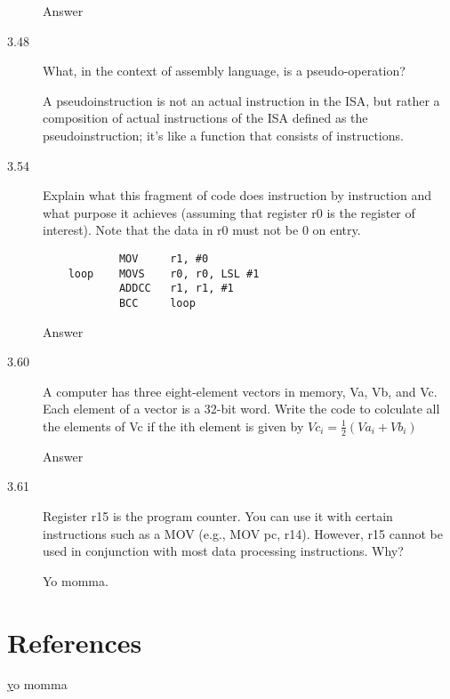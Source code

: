 \documentclass[letterpaper,10pt,titlepage]{article}
\begin{document}
\begin{description}
    Answer
    \item[3.48] What, in the context of assembly language, is a pseudo-operation?
    
    A pseudoinstruction is not an actual instruction in the ISA, but rather a composition of actual instructions of the ISA defined as the pseudoinstruction; it's like a function that consists of instructions.
    \item[3.54] Explain what this fragment of code does instruction by instruction and what purpose it achieves (assuming that register r0 is the register of interest). Note that the data in r0 must not be 0 on entry.
    \begin{lstlisting}
            MOV     r1, #0
    loop    MOVS    r0, r0, LSL #1
            ADDCC   r1, r1, #1
            BCC     loop
    \end{lstlisting}
    
    Answer
    \item[3.60] A computer has three eight-element vectors in memory, Va, Vb, and Vc. Each element of a vector is a 32-bit word. Write the code to colculate all the elements of Vc if the ith element is given by $Vc_i = \frac{1}{2}(Va_i + Vb_i)$
    
    Answer
    \item[3.61] Register r15 is the program counter. You can use it with certain instructions such as a MOV (e.g., MOV  pc, r14). However, r15 cannot be used in conjunction with most data processing instructions. Why?
    
    Yo momma.
\end{description}

\newpage
\section*{References}
\hyperlink{http://www.coranac.com/tonc/text/asm.htm}
\hyperlink{http://www.computerhope.com/jargon/p/pseuoper.htm}
\hyperlink{http://stackoverflow.com/questions/9210854/what-is-pseudo-op-in-assembly-programming}
yo momma
\end{document}
